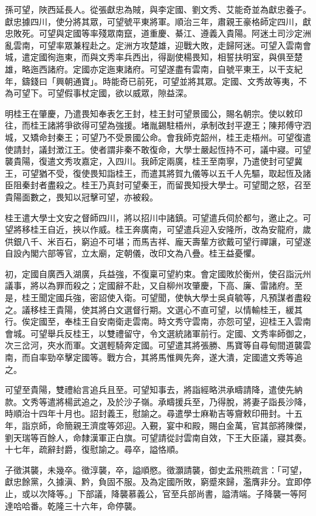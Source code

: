 \begin{pinyinscope}
孫可望，陜西延長人。從張獻忠為賊，與李定國、劉文秀、艾能奇並為獻忠養子。獻忠據四川，使分將其眾，可望號平東將軍。順治三年，肅親王豪格師定四川，獻忠敗死。可望與定國等率殘眾南竄，道重慶、綦江、遵義入貴陽。阿迷土司沙定洲亂雲南，可望率眾兼程赴之。定洲方攻楚雄，迎戰大敗，走歸阿迷。可望入雲南會城，遣定國徇迤東，而與文秀率兵西出，得副使楊畏知，相誓扶明室，與俱至楚雄，略迤西諸府。定國亦定迤東諸府。可望遂盡有雲南，自號平東王，以干支紀年，鑄錢曰「興朝通寶」。時能奇已前死，可望並將其眾。定國、文秀故等夷，不為可望下。可望假事杖定國，欲以威眾，隙益深。

明桂王在肇慶，乃遣畏知奉表乞王封，桂王封可望景國公，賜名朝宗。使以敕印往，而桂王諸將爭欲得可望為強援。堵胤錫駐梧州，承制改封平遼王；陳邦傅守泗城，又矯命封秦王；可望乃不受景國公命。會我師克韶州，桂王走梧州。可望復遣使請封，議封澂江王。使者謂非秦不敢復命，大學士嚴起恆持不可，議中寢。可望襲貴陽，復遣文秀攻嘉定，入四川。我師定兩廣，桂王至南寧，乃遣使封可望冀王，可望猶不受，復使畏知詣桂王，而遣其將賀九儀等以五千人先驅，取起恆及諸臣阻秦封者盡殺之。桂王乃真封可望秦王，而留畏知授大學士。可望聞之怒，召至貴陽面數之，畏知以冠擊可望，亦被殺。

桂王遣大學士文安之督師四川，將以招川中諸鎮。可望遣兵伺於都勻，邀止之。可望將移桂王自近，挾以作威。桂王奔廣南，可望遣兵迎入安隆所，改為安龍府，歲供銀八千、米百石，窮迫不可堪；而馬吉祥、龐天壽輩方欲戴可望行禪讓，可望遂自設內閣六部等官，立太廟，定朝儀，改印文為八疊。桂王益憂懼。

初，定國自廣西入湖廣，兵益強，不復稟可望約束。會定國敗於衡州，使召詣沅州議事，將以為罪而殺之；定國辭不赴，又自柳州攻肇慶，下高、廉、雷諸府。至是，桂王聞定國兵強，密詔使入衛。可望聞，使執大學士吳貞毓等，凡預謀者盡殺之。議移桂王貴陽，使其將白文選督行期。文選心不直可望，以情輸桂王，緩其行。俟定國至，奉桂王自安南衛走雲南。時文秀守雲南，亦怨可望，迎桂王入雲南會城。可望舉兵反桂王，以雙禮留守，令文選統諸軍前行。定國、文秀率師御之，次三岔河，夾水而軍。文選輕騎奔定國。可望遣其將張勝、馬寶等自尋甸間道襲雲南，而自率勁卒擊定國等。戰方合，其將馬惟興先奔，遂大潰，定國遣文秀等追之。

可望至貴陽，雙禮紿言追兵且至。可望知事去，將詣經略洪承疇請降，遣使先納款。文秀等遣將楊武追之，及於沙子嶺。承疇援兵至，乃得脫，將妻子詣長沙降，時順治十四年十月也。詔封義王，慰諭之。尋遣學士麻勒吉等齎敕印冊封。十五年，詣京師，命簡親王濟度等郊迎。入覲，宴中和殿，賜白金萬，官其部將陳傑，劉天瑞等百餘人，命隸漢軍正白旗。可望請從討雲南自效，下王大臣議，寢其奏。十七年，疏辭封爵，復慰諭之。尋卒，謚恪順。

子徵淇襲，未幾卒。徵淳襲，卒，謚順愍。徵灝請襲，御史孟飛熊疏言：「可望，獻忠餘黨，久據滇、黔，負固不服。及為定國所敗，窮蹙來歸，濫膺非分。宜即停止，或以次降等。」下部議，降襲慕義公，官至兵部尚書，謚清端。子降襲一等阿達哈哈番。乾隆三十六年，命停襲。


\end{pinyinscope}
